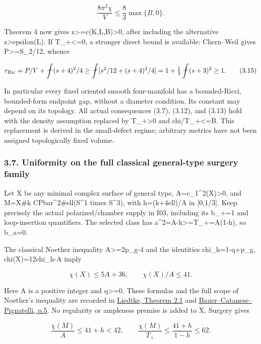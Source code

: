 \documentclass[
  10pt,
]{article}
\begin{document}
\[
 \frac{8\pi^2\chi}{V}\le\frac83\max\{B,0\}.
\]

Theorem 4 now gives z\textgreater=c(K,L,B)\textgreater0, after including
the alternative z\textgreater epsilon(L). If T\_+\textless=0, a stronger
direct bound is available: Chern--Weil gives P\textgreater=S\_2/12,
whence

\[
 r_{\rm Ric}=P/V+\fint(s+4)^2/4
 \ge\fint[s^2/12+(s+4)^2/4]
 =1+\tfrac13\fint(s+3)^2\ge1.                      \tag{3.15}
\]

In particular every fixed oriented smooth four-manifold has a
bounded-Ricci, bounded-form endpoint gap, without a diameter condition.
Its constant may depend on its topology. All actual consequences (3.7),
(3.12), and (3.13) hold with the density assumption replaced by
T\_+\textgreater0 and chi/T\_+\textless=B. This replacement is derived
in the small-defect regime; arbitrary metrics have not been assigned
topologically fixed volume.

\hypertarget{uniformity-on-the-full-classical-general-type-surgery-family}{%
\subsubsection{3.7. Uniformity on the full classical general-type
surgery
family}\label{uniformity-on-the-full-classical-general-type-surgery-family}}

Let X be any minimal complex surface of general type,
A=c\_1\^{}2(X)\textgreater0, and M=X\#k CPbar\^{}2\#ell(S\^{}1 times
S\^{}3), with h=(k+4ell)/A in {[}0,1/3{]}. Keep precisely the actual
polarized/chamber supply in I03, including its b\_+=1 and loop-insertion
quantifiers. The selected class has a\^{}2=A-k\textgreater=T\_+=A(1-h),
so b\_a=0.

The classical Noether inequality A\textgreater=2p\_g-4 and the
identities chi\_h=1-q+p\_g, chi(X)=12chi\_h-A imply

\[
 \chi(X)\le5A+36,\qquad \chi(X)/A\le41.
\]

Here A is a positive integer and q\textgreater=0. These formulas and the
full scope of Noether's inequality are recorded in
\href{https://arxiv.org/pdf/math/0702548}{Liedtke, Theorem 2.1} and
\href{https://www.mathe8.uni-bayreuth.de/de/team/prof-fabrizio-catanese-old/pdf/101.pdf}{Bauer--Catanese--Pignatelli,
p.5}. No regularity or ampleness premise is added to X. Surgery gives

\[
 \frac{\chi(M)}A\le41+h<42,\qquad
 \frac{\chi(M)}{T_+}\le\frac{41+h}{1-h}\le62.        \tag{3.16}
\]
\end{document}

